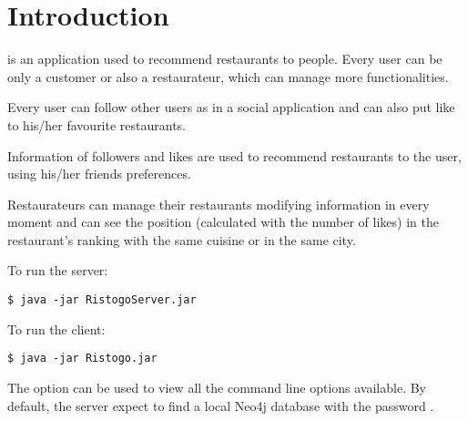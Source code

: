 \section{Introduction}

 is an application used to recommend restaurants to people.
Every user can be only a customer or also a restaurateur, which can manage more
functionalities.

Every user can follow other users as in a social application and can also put
like to his/her favourite restaurants.

Information of followers and likes are used to recommend restaurants to the
user, using his/her friends preferences.

Restaurateurs can manage their restaurants modifying information in every moment
and can see the position (calculated with the number of likes) in the
restaurant's ranking with the same cuisine or in the same city.

To run the server:
\begin{verbatim}
$ java -jar RistogoServer.jar
\end{verbatim}
To run the client:
\begin{verbatim}
$ java -jar Ristogo.jar
\end{verbatim}
The  option can be used to view all the command line options available.
By default, the server expect to find a local Neo4j database with the password
.
